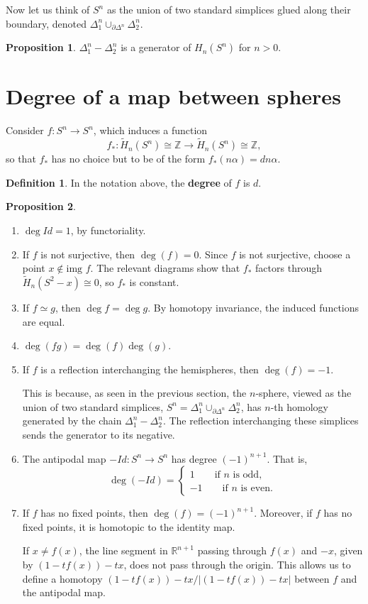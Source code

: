 \documentclass{book}
\theoremstyle{definition}
\newtheorem*{defn}{Definition}
\newtheorem*{prop}{Proposition}
\newcommand{\R}{\mathbb{R}}
\begin{document}
Now let us think of $S^n$ as the union of two standard
simplices glued along their boundary, denoted
$\Delta_1^n\cup_{\partial\Delta^n}\Delta_2^n$.

\begin{prop}
$\Delta^n_1-\Delta^n_2$ is a generator of $H_n(S^n)$ for
$n>0$.
\end{prop}

\section{Degree of a map between spheres}

Consider $f:S^n\to S^n$, which induces a function
$$
f_*:\tilde H_n(S^n)\cong\mathbb Z
\to
\tilde H_n(S^n)\cong\mathbb Z,
$$
so that $f_*$ has no choice but to be of the form
$f_*(n\alpha)=dn\alpha$.

\begin{defn}
In the notation above, the \textbf{degree} of $f$ is $d$.
\end{defn}

\begin{prop}\leavevmode
\begin{enumerate}
\item $\deg Id=1$, by functoriality.
\item If $f$ is not surjective, then $\deg(f)=0$. Since $f$
is not surjective, choose a point $x\notin\text{img }f$.
The relevant diagrams show that $f_*$ factors through
$\tilde H_n(S^2-x)\cong0$, so $f_*$ is constant.
\item If $f\simeq g$, then $\deg f=\deg g$. By homotopy
invariance, the induced functions are equal.
\item $\deg(fg)=\deg(f)\deg(g)$.
\item If $f$ is a reflection interchanging the hemispheres,
then $\deg(f)=-1$.

This is because, as seen in the previous section, the
$n$-sphere, viewed as the union of two standard simplices,
$S^n=\Delta_1^n\cup_{\partial\Delta^n}\Delta_2^n$, has
$n$-th homology generated by the chain
$\Delta_1^n-\Delta_2^n$. The reflection interchanging these
simplices sends the generator to its negative.
\item The antipodal map $-Id:S^n\to S^n$ has degree
$(-1)^{n+1}$. That is,
$$
\deg(-Id)=
\begin{cases}
1\qquad\text{if }n\text{ is odd},\\
-1\qquad\text{if }n\text{ is even}.
\end{cases}
$$
\item If $f$ has no fixed points, then
$\deg(f)=(-1)^{n+1}$. Moreover, if $f$ has no fixed points,
it is homotopic to the identity map.

If $x\neq f(x)$, the line segment in $\R^{n+1}$ passing
through $f(x)$ and $-x$, given by $(1-tf(x))-tx$, does not
pass through the origin. This allows us to define a homotopy
$(1-tf(x))-tx/|(1-tf(x))-tx|$ between $f$ and the antipodal
map.
\end{enumerate}
\end{prop}
\end{document}
